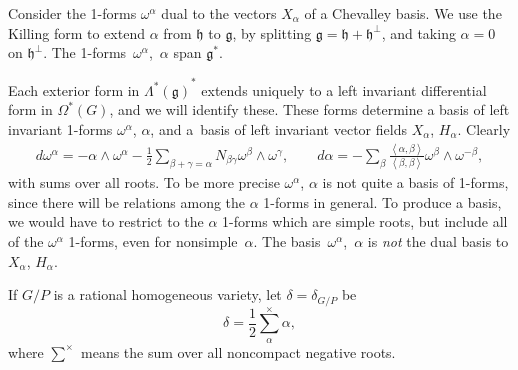 \documentclass[11pt]{article}
\newcommand{\Lm}[2]{\ensuremath{\Lambda^{#1} \left ( {#2} \right )}}
\newcommand{\nForms}[2]{\ensuremath{\Omega^{#1} \left ( {#2} \right
    )}}
\newcommand{\Gtot}{\ensuremath{G}}
\newcommand{\gtot}{\mathfrak{g}}
\newcommand{\cartan}{\ensuremath{\mathfrak{h}}}
\begin{document}
Consider the 1-forms $\omega^{\alpha}$ dual to the vectors
$X_{\alpha}$ of a Chevalley basis. We use the Killing form to extend $\alpha$ from $\cartan$ to $\gtot$,
by splitting $\gtot = \cartan + \cartan^{\perp}$,
and taking $\alpha=0$ on $\cartan^{\perp}$. The 1-forms~$\omega^{\alpha}$,~$\alpha$
span $\gtot^*$.

Each exterior form in $\Lm{*}{\gtot}^*$ extends uniquely to
a left invariant dif\/ferential form in $\nForms{*}{\Gtot}$, and we will
identify these. These forms determine a basis of left invariant 1-forms
$\omega^{\alpha}$, $\alpha$, and a~basis of left invariant vector
f\/ields $X_{\alpha}$, $H_{\alpha}$. Clearly
\begin{gather*}
d \omega^{\alpha}  = - \alpha \wedge \omega^{\alpha} - \frac{1}{2}
\sum_{\beta + \gamma=\alpha} N_{\beta \gamma} \omega^{\beta} \wedge \omega^{\gamma}, \qquad
d \alpha  =
-
\sum_{\beta} \frac{\left<\alpha,\beta\right>}
{\left<\beta,\beta\right>} \omega^{\beta} \wedge \omega^{-\beta},
\end{gather*}
with sums over all roots.
To be more precise $\omega^{\alpha}$, $\alpha$ is not quite a basis of 1-forms,
since there will be relations among the $\alpha$ 1-forms
in general. To produce a basis, we would have to restrict
to the $\alpha$ 1-forms which are simple roots, but
include all of the $\omega^{\alpha}$ 1-forms,
even for nonsimple~$\alpha$. The basis~$\omega^{\alpha}$,~$\alpha$
is \emph{not} the dual basis to $X_{\alpha}$, $H_{\alpha}$.

\begin{definition}
If $G/P$ is a rational homogeneous variety,
let $\delta = \delta_{G/P}$ be
\[
\delta = \frac{1}{2} \sum_{\alpha}^{\times} \alpha,
\]
where $\sum^{\times}$ means the sum over all noncompact negative roots.
\end{definition}
\end{document}
